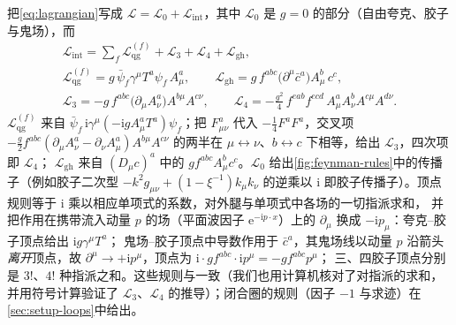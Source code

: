 \documentclass[UTF8,a4paper,11pt,fontset=fandol]{ctexart}
\theoremstyle{cplain}
\theoremstyle{cdefinition}
\theoremstyle{cremark}
\numberwithin{equation}{section}
\newcommand{\ii}{\mathrm{i}}                        %
\newcommand{\ee}{\mathrm{e}}                        %
\begin{document}
把\cref{eq:lagrangian}写成 $\mathcal L=\mathcal L_0+\mathcal L_{\mathrm{int}}$，其中 $\mathcal L_0$ 是 $g=0$ 的部分（自由夸克、胶子与鬼场），而
\begin{equation}\label{eq:setup-Lint}
\begin{gathered}
\mathcal L_{\mathrm{int}}=\sum_f\mathcal L^{(f)}_{\mathrm{qg}}+\mathcal L_3+\mathcal L_4+\mathcal L_{\mathrm{gh}},\\
\mathcal L^{(f)}_{\mathrm{qg}}=g\,\bar\psi_f\gamma^\mu T^a\psi_f\,A^a_\mu,\qquad
\mathcal L_{\mathrm{gh}}=g\,f^{abc}\bigl(\partial^\mu\bar c^a\bigr)A^b_\mu\,c^c,\\
\mathcal L_3=-g\,f^{abc}\bigl(\partial_\mu A^a_\nu\bigr)A^{b\mu}A^{c\nu},\qquad
\mathcal L_4=-\frac{g^2}{4}\,f^{eab}f^{ecd}\,A^a_\mu A^b_\nu A^{c\mu}A^{d\nu}.
\end{gathered}
\end{equation}
$\mathcal L^{(f)}_{\mathrm{qg}}$ 来自 $\bar\psi_f\,\ii\gamma^\mu(-\ii gA^a_\mu T^a)\psi_f$；把 $F^a_{\mu\nu}$ 代入 $-\frac14F^aF^a$，交叉项
$-\frac g2f^{abc}(\partial_\mu A^a_\nu-\partial_\nu A^a_\mu)A^{b\mu}A^{c\nu}$ 的两半在 $\mu\leftrightarrow\nu$、$b\leftrightarrow c$ 下相等，给出 $\mathcal L_3$，四次项即 $\mathcal L_4$；
$\mathcal L_{\mathrm{gh}}$ 来自 $(D_\mu c)^a$ 中的 $gf^{abc}A^b_\mu c^c$。$\mathcal L_0$ 给出\cref{fig:feynman-rules}中的传播子（例如胶子二次型
$-k^2g_{\mu\nu}+(1-\xi^{-1})k_\mu k_\nu$ 的逆乘以 $\ii$ 即胶子传播子）。顶点规则等于 $\ii$ 乘以相应单项式的系数，对外腿与单项式中各场的一切指派求和，
并把作用在携带流入动量 $p$ 的场（平面波因子 $\ee^{-\ii p\cdot x}$）上的 $\partial_\mu$ 换成 $-\ii p_\mu$：夸克--胶子顶点给出 $\ii g\gamma^\mu T^a$；
鬼场--胶子顶点中导数作用于 $\bar c^a$，其鬼场线以动量 $p$ 沿箭头\emph{离开}顶点，故 $\partial^\mu\to+\ii p^\mu$，顶点为 $\ii\cdot gf^{abc}\cdot\ii p^\mu=-gf^{abc}p^\mu$；
三、四胶子顶点分别是 $3!$、$4!$ 种指派之和。这些规则与\cite[第 16 章]{PeskinSchroeder1995}一致（我们也用计算机核对了对指派的求和，
并用符号计算验证了 $\mathcal L_3$、$\mathcal L_4$ 的推导）；闭合圈的规则（因子 $-1$ 与求迹）在\cref{sec:setup-loops}中给出。
\end{document}

